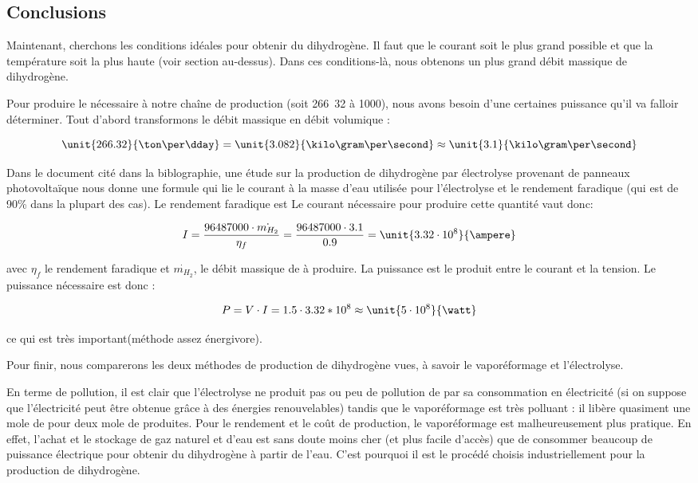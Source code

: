 \subsection{Conclusions}
Maintenant, cherchons les conditions idéales pour obtenir du dihydrogène.
Il faut que le courant soit le plus grand possible et que la température
soit la plus haute (voir section au-dessus). Dans ces conditions-là, nous
obtenons un plus grand débit massique de dihydrogène.

Pour produire le  nécessaire à notre chaîne de production
(soit \unit{266.32}{\ton\per\dday} à \unit{1000}{\kelvin}), nous avons besoin d'une
certaines puissance qu'il va falloir déterminer. Tout d'abord transformons
le débit massique en débit volumique :

$$\unit{266.32}{\ton\per\dday} = \unit{3.082}{\kilo\gram\per\second} \approx \unit{3.1}{\kilo\gram\per\second}$$

Dans le document cité dans la biblographie\cite{electrolyse}, une étude sur la production
de dihydrogène par électrolyse provenant de panneaux photovoltaïque nous
donne une formule qui lie le courant à la masse d'eau utilisée pour
l'électrolyse et le rendement faradique (qui est de 90\% dans la plupart des cas).
Le rendement faradique est Le courant nécessaire pour produire cette quantité vaut donc:

$$I = \frac{96487000\cdot {\dot{m_{H_2}}}}{\eta_f} = \frac{96487000\cdot 3.1}{0.9} =  \unit{3.32\cdot 10^8}{\ampere}$$

avec $\eta_f$ le rendement faradique et $\dot{m_{H_2}}$, le débit massique
de  à produire. La puissance est le produit entre le courant et la
tension. Le puissance nécessaire est donc :

$$P = V\cdot I = 1.5\cdot 3.32*10^8 \approx \unit{5\cdot 10^8}{\watt}$$

ce qui est très important(méthode assez énergivore).

Pour finir, nous comparerons les deux méthodes de production de
dihydrogène vues, à savoir le vaporéformage et l'électrolyse.

En terme de pollution, il est clair que l'électrolyse ne produit
pas ou peu de pollution de par sa consommation en électricité
(si on suppose que l'électricité peut être obtenue grâce à des énergies renouvelables)
tandis que le vaporéformage est très polluant : il libère quasiment une mole de 
pour deux mole de  produites. Pour le rendement et le coût de production,
le vaporéformage est malheureusement plus pratique. En effet, l'achat et le stockage
de gaz naturel et d'eau est sans doute moins cher (et plus facile d'accès) que
de consommer beaucoup de puissance électrique pour obtenir du dihydrogène à partir
de l'eau. C'est pourquoi il est le procédé choisis industriellement pour la production
de dihydrogène.

